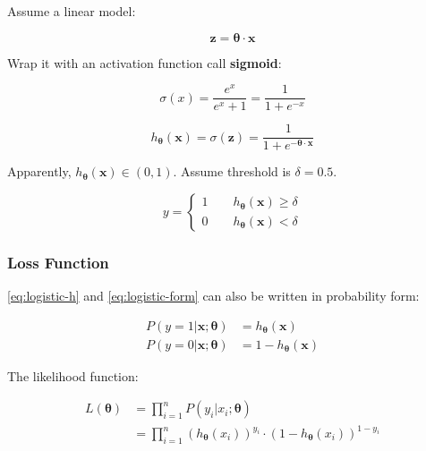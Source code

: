 \documentclass[journal, a4paper]{IEEEtran}
\begin{document}
Assume a linear model:
    
\begin{equation}\label{eq:linear-model}
    \mathbf{z} = \boldsymbol\theta \cdot \mathbf{x}
\end{equation}        
    
Wrap it with an activation function call \textbf{sigmoid}:
    
\begin{equation}\label{eq:sigmoid}
    \sigma(x) = \frac{e^x}{e^x+1} = \frac{1}{1+e^{-x}}
\end{equation}
    
\begin{equation}\label{eq:logistic-h}
    h_{\boldsymbol\theta}(\mathbf{x}) = \sigma(\mathbf{z}) = \frac{1}{1+e^{-\boldsymbol\theta\cdot\mathbf{x}}}
\end{equation}

Apparently, $h_{\boldsymbol\theta}(\mathbf{x}) \in (0,1)$. Assume threshold is $\delta=0.5$.

\begin{equation}\label{eq:logistic-form}
    y = \left\{
    \begin{aligned}
        1 \qquad h_{\boldsymbol\theta}(\mathbf{x}) \geq \delta\\
        0 \qquad h_{\boldsymbol\theta}(\mathbf{x}) < \delta
    \end{aligned}
    \right.
\end{equation}

\subsubsection{Loss Function}

\eqref{eq:logistic-h} and \eqref{eq:logistic-form} can also be written in probability form:

\begin{equation}\label{eq:logistic-p}
    \begin{split}
        P(y = 1 | \mathbf{x};\boldsymbol\theta) & = h_{\boldsymbol\theta}(\mathbf{x}) \\
        P(y = 0 | \mathbf{x};\boldsymbol\theta) & = 1 - h_{\boldsymbol\theta}(\mathbf{x})
    \end{split}
\end{equation}

The likelihood function:

\begin{equation}\label{eq:likelihood}
    \begin{split}
        L(\boldsymbol\theta) & = \prod_{i=1}^{n} P(y_i|x_i;\boldsymbol\theta) \\
                             & = \prod_{i=1}^{n} (h_{\boldsymbol\theta}(x_i))^{y_i} \cdot (1-h_{\boldsymbol\theta}(x_i))^{1-y_i}
    \end{split}
\end{equation}
\end{document}
